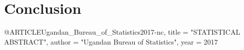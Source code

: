 \documentclass[12pt]{article} %
\begin{document}





\section{Conclusion} %

\lipsum[12-13]


\begin{thebibliography}{99} %

@ARTICLE{Ugandan_Bureau_of_Statistics2017-nc,
  title  = "{STATISTICAL} {ABSTRACT}",
  author = "{Ugandan Bureau of Statistics}",
  year   =  2017
}

\end{thebibliography}

\end{document}
